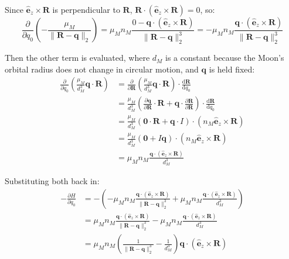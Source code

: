 \documentclass[titlepage]{article}
\begin{document}
Since $\hat{\boldsymbol{e}}_z\times\boldsymbol{R}$ is perpendicular to $\boldsymbol{R}$, $\boldsymbol{R}\cdot\left(\hat{\boldsymbol{e}}_z\times\boldsymbol{R}\right)=0$, so:
\begin{equation}
	\frac{\partial}{\partial q_0}\left(-\frac{\mu_M}{\|\boldsymbol{R}-\boldsymbol{q}\|_2}\right)=\mu_Mn_M\frac{0-\boldsymbol{q}\cdot\left(\hat{\boldsymbol{e}}_z\times\boldsymbol{R}\right)}{\|\boldsymbol{R}-\boldsymbol{q}\|_2^3}=-\mu_Mn_M\frac{\boldsymbol{q}\cdot\left(\hat{\boldsymbol{e}}_z\times\boldsymbol{R}\right)}{\|\boldsymbol{R}-\boldsymbol{q}\|_2^3}
\end{equation}

Then the other term is evaluated, where $d_M$ is a constant because the Moon's orbital radius does not change in circular motion, and $\boldsymbol{q}$ is held fixed:
\begin{equation}
	\begin{split}
		\frac{\partial}{\partial q_0}\left(\frac{\mu_M}{d_M^3}\boldsymbol{q}\cdot\boldsymbol{R}\right)&=\frac{\partial}{\partial\boldsymbol{R}}\left(\frac{\mu_M}{d_M^3}\boldsymbol{q}\cdot\boldsymbol{R}\right)\cdot\frac{\mathrm{d}\boldsymbol{R}}{\mathrm{d}q_0} \\
		&=\frac{\mu_M}{d_M^3}\left(\frac{\partial\boldsymbol{q}}{\partial\boldsymbol{R}}\cdot\boldsymbol{R}+\boldsymbol{q}\cdot\frac{\partial\boldsymbol{R}}{\partial\boldsymbol{R}}\right)\cdot\frac{\mathrm{d}\boldsymbol{R}}{\mathrm{d}q_0} \\
		&=\frac{\mu_M}{d_M^3}\left(\boldsymbol{0}\cdot\boldsymbol{R}+\boldsymbol{q}\cdot I\right)\cdot\left(n_M\hat{\boldsymbol{e}}_z\times\boldsymbol{R}\right) \\
		&=\frac{\mu_M}{d_M^3}\left(\boldsymbol{0}+I\boldsymbol{q}\right)\cdot\left(n_M\hat{\boldsymbol{e}}_z\times\boldsymbol{R}\right) \\
		&=\mu_Mn_M\frac{\boldsymbol{q}\cdot\left(\hat{\boldsymbol{e}}_z\times\boldsymbol{R}\right)}{d_M^3}
	\end{split}
\end{equation}

Substituting both back in:
\begin{equation}
	\begin{split}
		-\frac{\partial H}{\partial q_0}&=-\left(-\mu_Mn_M\frac{\boldsymbol{q}\cdot\left(\hat{\boldsymbol{e}}_z\times\boldsymbol{R}\right)}{\|\boldsymbol{R}-\boldsymbol{q}\|_2^3}+\mu_Mn_M\frac{\boldsymbol{q}\cdot\left(\hat{\boldsymbol{e}}_z\times\boldsymbol{R}\right)}{d_M^3}\right) \\
		&=\mu_Mn_M\frac{\boldsymbol{q}\cdot\left(\hat{\boldsymbol{e}}_z\times\boldsymbol{R}\right)}{\|\boldsymbol{R}-\boldsymbol{q}\|_2^3}-\mu_Mn_M\frac{\boldsymbol{q}\cdot\left(\hat{\boldsymbol{e}}_z\times\boldsymbol{R}\right)}{d_M^3} \\
		&=\mu_Mn_M\left(\frac{1}{\|\boldsymbol{R}-\boldsymbol{q}\|_2^3}-\frac{1}{d_M^3}\right)\boldsymbol{q}\cdot\left(\hat{\boldsymbol{e}}_z\times\boldsymbol{R}\right)
	\end{split}
\end{equation}
\end{document}
